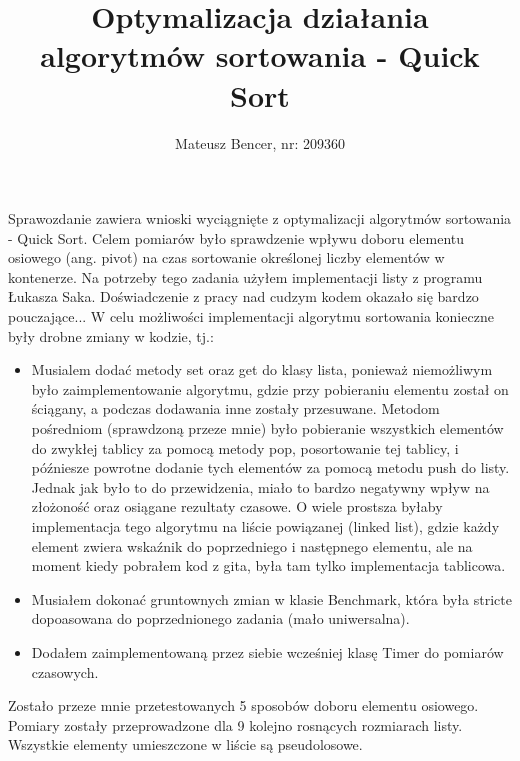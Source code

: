 \documentclass[11pt]{article}
\title{Optymalizacja działania algorytmów sortowania - Quick Sort}
\author{Mateusz Bencer, nr: 209360}
\begin{document}
\maketitle
Sprawozdanie zawiera wnioski wyciągnięte z optymalizacji algorytmów sortowania - Quick Sort. Celem pomiarów było sprawdzenie wpływu doboru elementu osiowego (ang. pivot) 
na czas sortowanie określonej liczby elementów w kontenerze. Na potrzeby tego zadania użyłem implementacji listy z programu Łukasza Saka. Doświadczenie z pracy nad cudzym kodem okazało się bardzo pouczające...
\newline
W celu możliwości implementacji algorytmu sortowania konieczne były drobne zmiany w kodzie, tj.:

\begin{itemize}
  \item Musialem dodać metody set oraz get do klasy lista, ponieważ niemożliwym było zaimplementowanie 
  algorytmu, gdzie przy pobieraniu elementu został on ściągany, a podczas dodawania inne zostały przesuwane. Metodom pośredniom (sprawdzoną przeze mnie) było pobieranie wszystkich elementów do zwykłej tablicy za pomocą metody pop, posortowanie tej tablicy, i późniesze powrotne dodanie tych 
  elementów za pomocą metodu push do listy. Jednak jak było to do przewidzenia, miało to bardzo negatywny wpływ na złożoność oraz osiągane rezultaty czasowe. O wiele prostsza byłaby implementacja tego algorytmu na liście powiązanej (linked list), gdzie każdy element zwiera wskaźnik do poprzedniego i następnego elementu, ale na moment kiedy pobrałem kod z gita, była tam tylko implementacja tablicowa.
  \item Musiałem dokonać gruntownych zmian w klasie Benchmark, która była stricte dopoasowana do poprzednionego zadania (mało uniwersalna).
  \item Dodałem zaimplementowaną przez siebie wcześniej klasę Timer do pomiarów czasowych.
\end{itemize}
Zostało przeze mnie przetestowanych 5 sposobów doboru elementu osiowego. Pomiary zostały przeprowadzone dla 9 kolejno rosnących rozmiarach listy. Wszystkie elementy umieszczone w liście są pseudolosowe.
\end{document}
